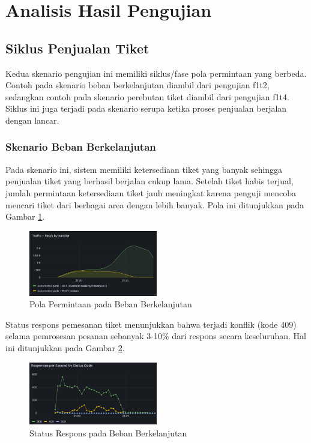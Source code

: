 \section{Analisis Hasil Pengujian}

\subsection{Siklus Penjualan Tiket}

Kedua skenario pengujian ini memiliki siklus/fase pola permintaan yang berbeda. Contoh pada skenario beban berkelanjutan diambil dari pengujian f1t2, sedangkan contoh pada skenario perebutan tiket diambil dari pengujian f1t4. Siklus ini juga terjadi pada skenario serupa ketika proses penjualan berjalan dengan lancar.

\subsubsection{Skenario Beban Berkelanjutan}

Pada skenario ini, sistem memiliki ketersediaan tiket yang banyak sehingga penjualan tiket yang berhasil berjalan cukup lama. Setelah tiket habis terjual, jumlah permintaan ketersediaan tiket jauh meningkat karena penguji mencoba mencari tiket dari berbagai area dengan lebih banyak. Pola ini ditunjukkan pada Gambar \ref{fig:pattern-stress-traffic}.

\begin{figure}[htbp]
    \centering
    \includegraphics[width=0.5\textwidth]{resources/chapter-4/pattern-stress-traffic.png}
    \caption{Pola Permintaan pada Beban Berkelanjutan}
    \label{fig:pattern-stress-traffic}
\end{figure}

Status respons pemesanan tiket menunjukkan bahwa terjadi konflik (kode 409) selama pemrosesan pesanan sebanyak 3-10\% dari respons secara keseluruhan. Hal ini ditunjukkan pada Gambar \ref{fig:pattern-stress-order}.

\begin{figure}[htbp]
    \centering
    \includegraphics[width=0.5\textwidth]{resources/chapter-4/pattern-stress-order.png}
    \caption{Status Respons pada Beban Berkelanjutan}
    \label{fig:pattern-stress-order}
\end{figure}

